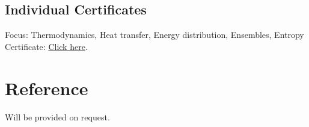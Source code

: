 \documentclass[
  a4paper, 
]{fortysecondscv}
\begin{document}
\subsection{Individual Certificates}
\begin{cvtable}
		{{\color{sectioncolor}Focus:} Thermodynamics, Heat transfer, Energy distribution, Ensembles, Entropy \\ {\color{sectioncolor}Certificate:} \href{https://www.coursera.org/account/accomplishments/certificate/CYRHDTBSU655}{Click here}.
		}
\end{cvtable}

\section{Reference}
Will be provided on request. 




\end{document}
